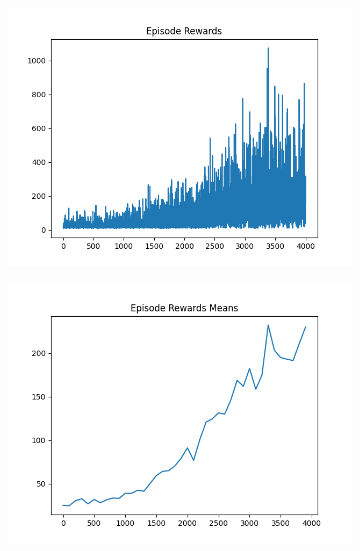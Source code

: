 \begin{figure}[H]
    \centering
    \begin{subfigure}{.47\linewidth}
        \centering
        \includegraphics[width=\textwidth]{pole/2024-06-13_23-49-30_dqn_cartpole_episode_rewards.png}
    \end{subfigure}
    \begin{subfigure}{.47\linewidth}
        \centering
        \includegraphics[width=\textwidth]{pole/2024-06-13_23-49-30_dqn_cartpole_episode_rewards_means.png}
    \end{subfigure}
    \begin{subfigure}{.47\linewidth}
        \centering

\end{subfigure}
\end{figure}
